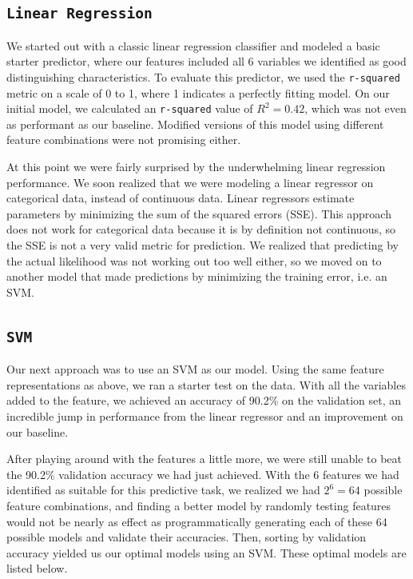 \documentclass[11pt]{article}
\begin{document}
\subsection{\texttt{Linear Regression}}

We started out with a classic linear regression classifier and modeled a basic starter predictor, where our features included all 6 variables we identified as good distinguishing characteristics. To evaluate this predictor, we used the \texttt{r-squared} metric on a scale of 0 to 1, where 1 indicates a perfectly fitting model. On our initial model, we calculated an \texttt{r-squared} value of $R^2=0.42$, which was not even as performant as our baseline. Modified versions of this model using different feature combinations were not promising either.

At this point we were fairly surprised by the underwhelming linear regression performance. We soon realized that we were modeling a linear regressor on categorical data, instead of continuous data. Linear regressors estimate parameters by minimizing the sum of the squared errors (SSE). This approach does not work for categorical data because it is by definition not continuous, so the SSE is not a very valid metric for prediction. We realized that predicting by the actual likelihood was not working out too well either, so we moved on to another model that made predictions by minimizing the training error, i.e. an SVM.

\subsection{\texttt{SVM}}

Our next approach was to use an SVM as our model. Using the same feature representations as above, we ran a starter test on the data. With all the variables added to the feature, we achieved an accuracy of 90.2\% on the validation set, an incredible jump in performance from the linear regressor and an improvement on our baseline.

After playing around with the features a little more, we were still unable to beat the 90.2\% validation accuracy we had just achieved. With the 6 features we had identified as suitable for this predictive task, we realized we had $2^6=64$ possible feature combinations, and finding a better model by randomly testing features would not be nearly as effect as programmatically generating each of these 64 possible models and validate their accuracies. Then, sorting by validation accuracy yielded us our optimal models using an SVM. These optimal models are listed below.
\end{document}
